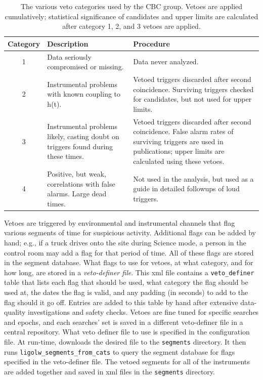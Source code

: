 \begin{table}
\label{tab:veto_cats}
\center
\begin{tabular}{c | p{5cm} | p{8cm}}
Category    &    Description    &   Procedure    \\
\hline
    1       &    Data seriously compromised or missing.    &    Data never analyzed. \\
\hline
    2       &    Instrumental problems with known coupling to h(t).    &    Vetoed triggers discarded after second coincidence. Surviving triggers checked for candidates, but not used for upper limits. \\
\hline
    3       &    Instrumental problems likely, casting doubt on triggers found during these times.    &    Vetoed triggers discarded after second coincidence. False alarm rates of surviving triggers are used in publications; upper limits are calculated using these vetoes.  \\
\hline
    4       &    Positive, but weak, correlations with false alarms. Large dead times.    &     Not used in the analysis, but used as a guide in detailed followups of loud triggers. \\
\end{tabular}
\caption{The various veto categories used by the \ac{CBC} group. Vetoes are applied cumulatively; statistical significance of candidates and upper limits are calculated after category 1, 2, and 3 vetoes are applied.}
\end{table}

Vetoes are triggered by environmental and instrumental channels that flag
various segments of time for suspicious activity. Additional flags can be added
by hand; e.g., if a truck drives onto the site during Science mode, a person
in the control room may add a flag for that period of time. All of these flags
are stored in the segment database. What flags to use for vetoes, at what
category, and for how long, are stored in a \emph{veto-definer file}. This xml
file contains a \texttt{veto\_definer} table that lists each flag that should
be used, what category the flag should be used at, the dates the flag is valid, and any
padding (in seconds) to add to the flag should it go off. Entries are added to
this table by hand after extensive data-quality investigations and safety
checks. Vetoes are fine tuned for specific searches and epochs, and each
searches' set is saved in a different veto-definer file in a central
repository. What veto definer file to use is specified in the \ihope
configuration file. At run-time, \ihope downloads the desired file to the
\texttt{segments} directory. It then runs \texttt{ligolw\_segments\_from\_cats}
to query the segment database for flags specified in the veto-definer file. The
vetoed segments for all of the instruments are added together and saved in xml
files in the \texttt{segments} directory.



